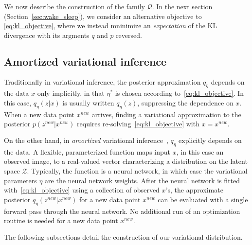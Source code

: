 We now describe the construction of the family $\mathcal{Q}$.
In the next section (Section~\ref{sec:wake_sleep}), we
consider an alternative objective to \eqref{eq:kl_objective},
where we instead mninimize an \textit{expectation}
of the KL divergence with its argments $q$ and $p$ reversed.


\subsection{Amortized variational inference}

Traditionally in variational inference, the posterior approximation $q_\eta$ depends on the data $x$ only implicitly,
in that $\eta^*$ is chosen according to~\eqref{eq:kl_objective}.
In this case, $q_\eta(z | x)$ is usually written $q_\eta(z)$, suppressing the dependence on $x$.
When a new data point $x^{new}$ arrives, finding a variational  approximation to the posterior $p(z^{new} | x^{new})$ requires re-solving~\eqref{eq:kl_objective} with $x = x^{new}$.



On the other hand,
in {\itshape amortized} variational
inference~\citep{kingma2013autoencoding, rezende2014stochastic}, $q_\eta$ explicitly depends on the data.
A flexible, parameterized function maps input $x$, in this case an observed image, to a real-valued vector characterizing a distribution on the latent space $\mathcal{Z}$.
Typically, the function is a neural network, in which case the variational parameters $\eta$ are the neural network weights.
After the neural network is fitted with~\eqref{eq:kl_objective} using a collection of observed $x$'s, the approximate posterior $q_\eta(z^{new} | x^{new})$ for a new data point
$x^{new}$ can be evaluated with a single forward pass through the neural network.
No additional run of an optimization routine is needed for a new data point $x^{new}$.

The following subsections detail the construction of our variational distribution.


